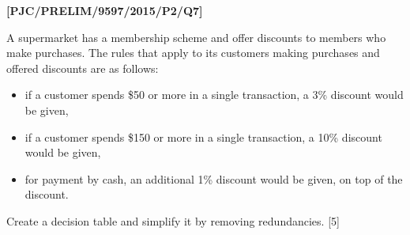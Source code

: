 \item \textbf{{[}PJC/PRELIM/9597/2015/P2/Q7{]} }

A supermarket has a membership scheme and offer discounts to members
who make purchases. The rules that apply to its customers making purchases
and offered discounts are as follows:
\begin{itemize}
\item if a customer spends \$50 or more in a single transaction, a 3\% discount
would be given, 
\item if a customer spends \$150 or more in a single transaction, a 10\%
discount would be given,
\item for payment by cash, an additional 1\% discount would be given, on
top of the discount. 
\end{itemize}
Create a decision table and simplify it by removing redundancies.\hfill{}
{[}5{]}